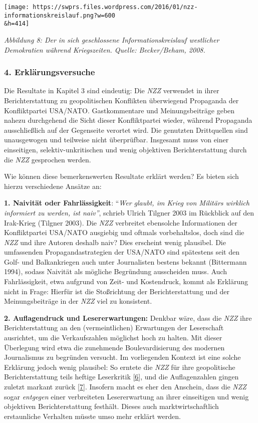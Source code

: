 \texttt{[image: https://swprs.files.wordpress.com/2016/01/nzz-informationskreislauf.png?w=600\\\&h=414]}

\emph{Abbildung 8: Der in sich geschlossene Informations­kreislauf
westlicher Demokratien während Kriegszeiten. Quelle: Becker/Beham,
2008.}

\hypertarget{4-erkluxe4rungsversuche}{%
\subsubsection{4. Erklärungsversuche}\label{4-erkluxe4rungsversuche}}

Die Resultate in Kapitel 3 sind eindeutig: Die \emph{NZZ} verwendet in
ihrer Berichterstattung zu geopolitischen Konflikten überwiegend
Propaganda der Konfliktpartei USA/NATO. Gastkommentare und
Meinungsbeiträge geben nahezu durchgehend die Sicht dieser
Konfliktpartei wieder, während Propaganda ausschließlich auf der
Gegenseite verortet wird. Die genutzten Drittquellen sind unausgewogen
und teilweise nicht überprüfbar. Insgesamt muss von einer einseitigen,
selektiv-unkritischen und wenig objektiven Berichterstattung durch die
\emph{NZZ} gesprochen werden.

Wie können diese bemerkenswerten Resultate erklärt werden? Es bieten
sich hierzu verschiedene Ansätze an:

\textbf{1. Naivität oder Fahrlässigkeit}: ``\emph{Wer glaubt, im Krieg
von Militärs wirklich informiert zu werden, ist naiv''}, schrieb Ulrich
Tilgner 2003 im Rückblick auf den Irak-Krieg (Tilgner 2003). Die
\emph{NZZ} verbreitet ebensolche Informationen der Konfliktpartei
USA/NATO ausgiebig und oftmals vorbehaltslos, doch sind die \emph{NZZ}
und ihre Autoren deshalb naiv? Dies erscheint wenig plausibel. Die
umfassenden Propaganda­strategien der USA/NATO sind spätestens seit den
Golf- und Balkankriegen auch unter Journalisten bestens bekannt
(Bittermann 1994), sodass Naivität als mögliche Begründung ausscheiden
muss. Auch Fahrlässigkeit, etwa aufgrund von Zeit- und Kostendruck,
kommt als Erklärung nicht in Frage: Hierfür ist die Stoßrichtung der
Berichterstattung und der Meinungsbeiträge in der \emph{NZZ} viel zu
konsistent.

\textbf{2. Auflagendruck und Lesererwartungen:} Denkbar wäre, dass die
\emph{NZZ} ihre Berichterstattung an den (vermeintlichen) Erwartungen
der Leserschaft ausrichtet, um die Verkaufszahlen möglichst hoch zu
halten. Mit dieser Überlegung wird etwa die zunehmende Boulevardisierung
des modernen Journalismus zu begründen versucht. Im vorliegenden Kontext
ist eine solche Erklärung jedoch wenig plausibel: So erntete die
\emph{NZZ} für ihre geopolitische Berichterstattung teils heftige
Leserkritik {[}\protect\hyperlink{anm6}{6}{]}, und die Auflagenzahlen
gingen zuletzt markant zurück {[}\protect\hyperlink{anm7}{7}{]}.
Insofern macht es eher den Anschein, dass die \emph{NZZ} sogar
\emph{entgegen} einer verbreiteten Lesererwartung an ihrer einseitigen
und wenig objektiven Berichterstattung festhält. Dieses auch
markt­wirt­schaftlich erstaunliche Verhalten müsste umso mehr erklärt
werden.

